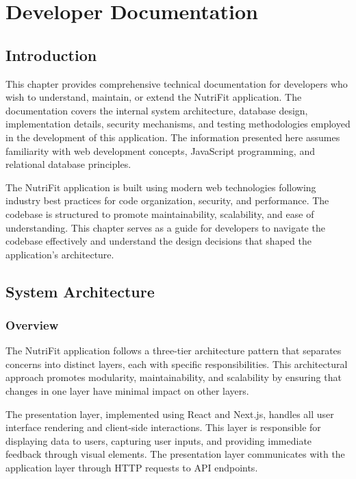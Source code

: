 \chapter{Developer Documentation}

\section{Introduction}

This chapter provides comprehensive technical documentation for developers who wish to understand, maintain, or extend the NutriFit application. The documentation covers the internal system architecture, database design, implementation details, security mechanisms, and testing methodologies employed in the development of this application. The information presented here assumes familiarity with web development concepts, JavaScript programming, and relational database principles.

The NutriFit application is built using modern web technologies following industry best practices for code organization, security, and performance. The codebase is structured to promote maintainability, scalability, and ease of understanding. This chapter serves as a guide for developers to navigate the codebase effectively and understand the design decisions that shaped the application's architecture.

\section{System Architecture}

\subsection{Overview}

The NutriFit application follows a three-tier architecture pattern that separates concerns into distinct layers, each with specific responsibilities. This architectural approach promotes modularity, maintainability, and scalability by ensuring that changes in one layer have minimal impact on other layers.

The presentation layer, implemented using React and Next.js, handles all user interface rendering and client-side interactions. This layer is responsible for displaying data to users, capturing user inputs, and providing immediate feedback through visual elements. The presentation layer communicates with the application layer through HTTP requests to API endpoints.


